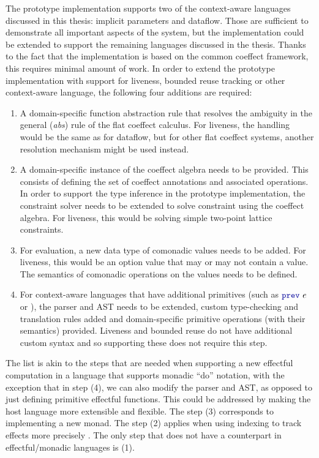 The prototype implementation supports two of the context-aware languages discussed in this thesis:
implicit parameters and dataflow. Those are sufficient to demonstrate all important aspects of the
system, but the implementation could be extended to support the remaining languages discussed in
the thesis. Thanks to the fact that the implementation is based on the common coeffect framework,
this requires minimal amount of work. In order to extend the prototype implementation with support
for liveness, bounded reuse tracking or other context-aware language, the following four additions
are required:

\begin{enumerate}
\item A domain-specific function abstraction rule that resolves the ambiguity in the general
  (\emph{abs}) rule of the flat coeffect calculus. For liveness, the handling would be the same
  as for dataflow, but for other flat coeffect systems, another resolution mechanism might be used
  instead.

\item A domain-specific instance of the coeffect algebra needs to be provided. This consists of
  defining the set of coeffect annotations and associated operations. In order to support
  the type inference in the prototype implementation, the constraint solver needs to be extended
  to solve constraint using the coeffect algebra. For liveness, this would be solving simple
  two-point lattice constraints.

\item For evaluation, a new data type of comonadic values needs to be added. For liveness, this would
  be an option value that may or may not contain a value. The semantics of comonadic operations on the
  values needs to be defined.

\item For context-aware languages that have additional primitives (such as $\kvd{prev}~e$ or ),
  the parser and AST needs to be extended, custom type-checking and translation rules added and
  domain-specific primitive operations (with their semantics) provided. Liveness and bounded reuse
  do not have additional custom syntax and so supporting these does not require this step.
\end{enumerate}

\noindent
The list is akin to the steps that are needed when supporting a new effectful computation in a 
language that supports monadic ``do'' notation, with the exception that in step (4), we can also
modify the parser and AST, as opposed to just defining primitive effectful functions.
This could be addressed by making the host language more extensible and flexible. 
The step (3) corresponds to implementing a new monad. The step (2) applies when using 
indexing to track effects more precisely \cite{effects-embedding}. The only step that does not
have a counterpart in effectful/monadic languages is (1).

